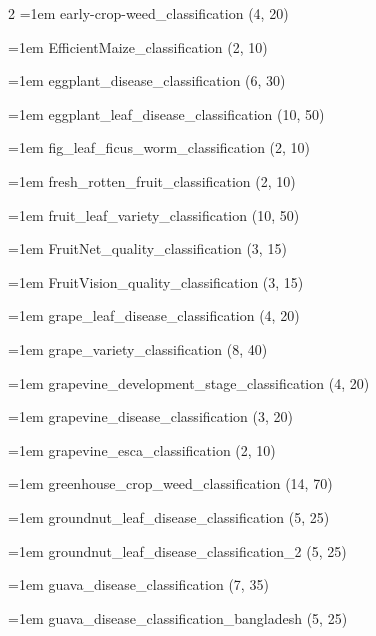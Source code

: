 \begin{multicols}{2}
\hangindent=1em early-crop-weed\_\allowbreak{}classification (4, 20)\par
\hangindent=1em EfficientMaize\_\allowbreak{}classification (2, 10)\par
\hangindent=1em eggplant\_\allowbreak{}disease\_\allowbreak{}classification (6, 30)\par
\hangindent=1em eggplant\_\allowbreak{}leaf\_\allowbreak{}disease\_\allowbreak{}classification (10, 50)\par
\hangindent=1em fig\_\allowbreak{}leaf\_\allowbreak{}ficus\_\allowbreak{}worm\_\allowbreak{}classification (2, 10)\par
\hangindent=1em fresh\_\allowbreak{}rotten\_\allowbreak{}fruit\_\allowbreak{}classification (2, 10)\par
\hangindent=1em fruit\_\allowbreak{}leaf\_\allowbreak{}variety\_\allowbreak{}classification (10, 50)\par
\hangindent=1em FruitNet\_\allowbreak{}quality\_\allowbreak{}classification (3, 15)\par
\hangindent=1em FruitVision\_\allowbreak{}quality\_\allowbreak{}classification (3, 15)\par
\hangindent=1em grape\_\allowbreak{}leaf\_\allowbreak{}disease\_\allowbreak{}classification (4, 20)\par
\hangindent=1em grape\_\allowbreak{}variety\_\allowbreak{}classification (8, 40)\par
\hangindent=1em grapevine\_\allowbreak{}development\_\allowbreak{}stage\_\allowbreak{}classification (4, 20)\par
\hangindent=1em grapevine\_\allowbreak{}disease\_\allowbreak{}classification (3, 20)\par
\hangindent=1em grapevine\_\allowbreak{}esca\_\allowbreak{}classification (2, 10)\par
\hangindent=1em greenhouse\_\allowbreak{}crop\_\allowbreak{}weed\_\allowbreak{}classification (14, 70)\par
\hangindent=1em groundnut\_\allowbreak{}leaf\_\allowbreak{}disease\_\allowbreak{}classification (5, 25)\par
\hangindent=1em groundnut\_\allowbreak{}leaf\_\allowbreak{}disease\_\allowbreak{}classification\_\allowbreak{}2 (5, 25)\par
\hangindent=1em guava\_\allowbreak{}disease\_\allowbreak{}classification (7, 35)\par
\hangindent=1em guava\_\allowbreak{}disease\_\allowbreak{}classification\_\allowbreak{}bangladesh (5, 25)\par

\end{multicols}
